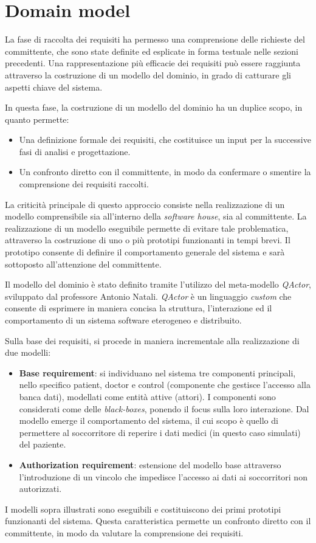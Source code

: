 \documentclass[a4paper,12pt]{report}
\begin{document}
\section{Domain model}
La fase di raccolta dei requisiti ha permesso una comprensione delle richieste del committente, che sono state definite ed esplicate in forma testuale nelle sezioni precedenti. Una rappresentazione più efficacie dei requisiti può essere raggiunta attraverso la costruzione di un modello del dominio, in grado di catturare gli aspetti chiave del sistema. 

In questa fase, la costruzione di un modello del dominio ha un duplice scopo, in quanto permette:
\begin{itemize}
	\item Una definizione formale dei requisiti, che costituisce un input per la successive fasi di analisi e progettazione.
	\item Un confronto diretto con il committente, in modo da confermare o smentire la comprensione dei requisiti raccolti. 
\end{itemize}

La criticità principale di questo approccio consiste nella realizzazione di un modello comprensibile sia all'interno della \emph{software house}, sia al committente. La realizzazione di un modello eseguibile permette di evitare tale problematica, attraverso la costruzione di uno o più prototipi funzionanti in tempi brevi. Il prototipo consente di definire il comportamento generale del sistema e sarà sottoposto all'attenzione del committente. 

Il modello del dominio è stato definito tramite l'utilizzo del meta-modello \emph{QActor}, sviluppato dal professore Antonio Natali. \emph{QActor} è un linguaggio \emph{custom} che consente di esprimere in maniera concisa la struttura, l'interazione ed il comportamento di un sistema software eterogeneo e distribuito.

Sulla base dei requisiti, si procede in maniera incrementale alla realizzazione di due modelli:
\begin{itemize}
	\item \textbf{Base requirement}: si individuano nel sistema tre componenti principali, nello specifico patient, doctor e control (componente che gestisce l'accesso alla banca dati), modellati come entità attive (attori). I componenti sono considerati come delle \emph{black-boxes}, ponendo il focus sulla loro interazione. Dal modello emerge il comportamento del sistema, il cui scopo è quello di permettere al soccorritore di reperire i dati medici (in questo caso simulati) del paziente.
	\item \textbf{Authorization requirement}: estensione del modello base attraverso l'introduzione di un vincolo che impedisce l'accesso ai dati ai soccorritori non autorizzati.
\end{itemize}
I modelli sopra illustrati sono eseguibili e costituiscono dei primi prototipi funzionanti del sistema. Questa caratteristica permette un confronto diretto con il committente, in modo da valutare la comprensione dei requisiti.
\end{document}

